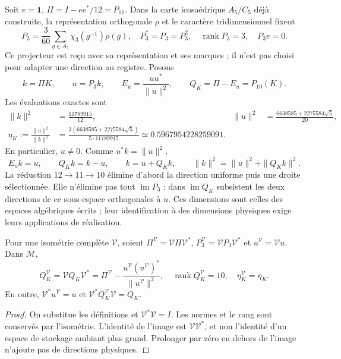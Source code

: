 Soit \(e=\mathbf1\), \(\Pi=I-ee^*/12=P_{11}\). Dans la carte
icosaédrique \(A_5/C_5\) déjà construite, la représentation orthogonale
\(\rho\) et le caractère tridimensionnel fixent
\begin{equation}
 P_3=\frac3{60}\sum_{g\in A_5}\chi_3(g^{-1})\rho(g),
 \quad P_3^*=P_3=P_3^2,\quad
 \operatorname{rank}P_3=3,\quad P_3e=0.
 \label{x_reciprocidad:lib01:P3}
\end{equation}
Ce projecteur est reçu avec sa représentation et ses marques ; il n’est pas choisi
pour adapter une direction au registre. Posons
\[
 k=\Pi K,\qquad u=P_3k,\qquad
 E_u=\frac{uu^*}{\|u\|^2},\qquad Q_K=\Pi-E_u=P_{10}(K).
\]
Les évaluations exactes sont
\begin{align}
 \|k\|^2&=\frac{11789915}{12},&
 \|u\|^2&=\frac{6638585+2275584\sqrt5}{20},
 \label{x_reciprocidad:lib01:normas-direccion}\\
 \eta_K:=\frac{\|u\|^2}{\|k\|^2}
 &=\frac{3(6638585+2275584\sqrt5)}{5\cdot11789915}
 \simeq0.5967954228259091.
 \label{x_reciprocidad:lib01:eta}
\end{align}
En particulier, \(u\ne0\). Comme \(u^*k=\|u\|^2\),
\begin{equation}
 E_uk=u,\qquad Q_Kk=k-u,\qquad
 k=u+Q_Kk,\qquad \|k\|^2=\|u\|^2+\|Q_Kk\|^2.
 \label{x_reciprocidad:lib01:particion-direccion}
\end{equation}
La réduction \(12\to11\to10\) élimine d’abord la direction uniforme
puis une droite sélectionnée. Elle n’élimine pas tout \(\operatorname{im}P_3\) :
dans \(\operatorname{im}Q_K\) subsistent les deux directions de ce
sous-espace orthogonales à \(u\). Ces dimensions sont celles des
espaces algébriques écrits ; leur identification à des dimensions physiques
exige leurs applications de réalisation.

\begin{proposition}
\label{x_reciprocidad:lib01:transporte-direccion}
Pour une isométrie complète \(\mathcal V\), soient
\(\Pi^{\mathcal V}=\mathcal V\Pi\mathcal V^*\),
\(P_3^{\mathcal V}=\mathcal VP_3\mathcal V^*\) et
\(u^{\mathcal V}=\mathcal Vu\). Dans \(\mathcal M\),
\[
 Q_K^{\mathcal V}
 =\mathcal VQ_K\mathcal V^*
 =\Pi^{\mathcal V}
 -\frac{u^{\mathcal V}(u^{\mathcal V})^*}{\|u^{\mathcal V}\|^2},
 \quad \operatorname{rank}Q_K^{\mathcal V}=10,
 \quad \eta_K^{\mathcal V}=\eta_K.
\]
En outre, \(\mathcal V^*u^{\mathcal V}=u\) et \(\mathcal V^*Q_K^{\mathcal V}\mathcal V=Q_K\).
\end{proposition}
\begin{proof}
On substitue les définitions et \(\mathcal V^*\mathcal V=I\). Les normes et le rang sont conservés par l'isométrie. L'identité de l'image est \(\mathcal V\mathcal V^*\), et non l'identité d'un espace de stockage ambiant plus grand. Prolonger par zéro en dehors de l'image n'ajoute pas de directions physiques.
\end{proof}

